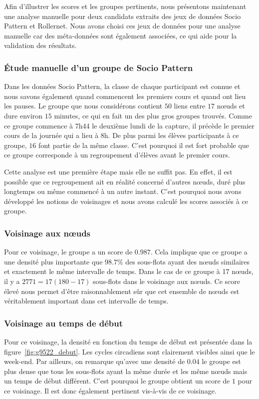
\bigskip

Afin d'illustrer les scores et les groupes pertinents, nous présentons maintenant une analyse manuelle pour deux candidats extraits des jeux de données Socio Pattern et Rollernet.
Nous avons choisi ces jeux de données pour une analyse manuelle car des méta-données sont également associées, ce qui aide pour la validation des résultats.

\subsubsection{\'Etude manuelle d'un groupe de Socio Pattern}
Dans les données Socio Pattern, la classe de chaque participant est connue et nous savons également quand commencent les premiers cours et quand ont lieu les pauses.
Le groupe que nous considérons contient $50$ liens entre $17$ n\oe uds et dure environ $15$ minutes, ce qui en fait un des plus gros groupes trouvés.
Comme ce groupe commence à 7h44 le deuxième lundi de la capture, il précède le premier cours de la journée qui a lieu à 8h.
De plus parmi les élèves participants à ce groupe, $16$ font partie de la même classe.
C'est pourquoi il est fort probable que ce groupe corresponde à un regroupement d'élèves avant le premier cours.

Cette analyse est une première étape mais elle ne suffit pas.
En effet, il est possible que ce regroupement ait en réalité concerné d'autres n\oe uds, duré plus longtemps ou même commencé à un autre instant.
C'est pourquoi nous avons développé les notions de voisinages et nous avons calculé les scores associés à ce groupe.

\subsubsection*{Voisinage aux n\oe uds}
Pour ce voisinage, le groupe a un score de $0.987$.
Cela implique que ce groupe a une densité plus importante que $98.7\%$ des sous-flots ayant des n\oe uds similaires et exactement le même intervalle de temps.
Dans le cas de ce groupe à 17 n\oe uds, il y a $2771=17(180-17)$ sous-flots dans le voisinage aux n\oe uds.
Ce score élevé nous permet d'être raisonnablement sûr que cet ensemble de n\oe uds est véritablement important dans cet intervalle de temps.

\subsubsection*{Voisinage au temps de début}
Pour ce voisinage, la densité en fonction du temps de début est présentée dans la figure~\ref{fig:g9522_debut}.
Les cycles circadiens sont clairement visibles ainsi que le week-end.
Par ailleurs, on remarque qu'avec une densité de $0.04$ le groupe est plus dense que tous les sous-flots ayant la même durée et les même n\oe uds mais un temps de début différent.
C'est pourquoi le groupe obtient un score de $1$ pour ce voisinage.
Il est donc également pertinent vis-à-vis de ce voisinage.

